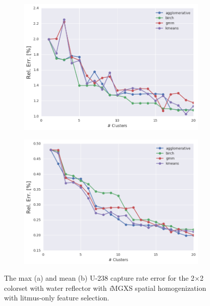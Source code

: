 \begin{figure}[h!]
\centering
\begin{subfigure}{0.9\textwidth}
  \centering
  \includegraphics[width=\linewidth]{figures/results/err-by-cluster/reflector/max-rel-err}
  \caption{}
  \label{fig:chap11-max-capt-err-by-cluster-assm-refl}
\end{subfigure}
\begin{subfigure}{0.9\textwidth}
  \centering
  \includegraphics[width=\linewidth]{figures/results/err-by-cluster/reflector/mean-rel-err}
  \caption{}
  \label{fig:chap11-mean-capt-err-by-cluster-assm-refl}
\end{subfigure}
\caption[U-238 capture rate errors for the 2$\times$2 colorset with reflector]{The max (a) and mean (b) U-238 capture rate error for the 2$\times$2 colorset with water reflector with \textit{i}\ac{MGXS} spatial homogenization with litmus-only feature selection.}
\label{fig:chap11-capt-err-by-cluster-assm-refl}
\end{figure}

